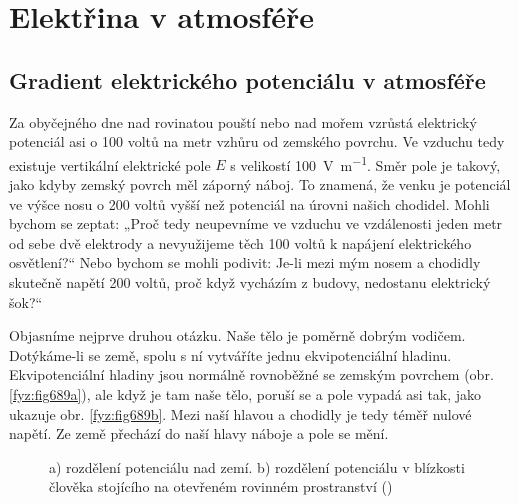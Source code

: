 \setchaptertoc
\chapter{Elektřina v atmosféře}\label{fyz:IIchapIX}  
  \section{Gradient elektrického potenciálu v atmosféře}\label{fyz:IIchapIXsecI}  
    Za obyčejného dne nad rovinatou pouští nebo nad mořem vzrůstá elektrický potenciál asi o
    \num{100} voltů na metr vzhůru od zemského povrchu. Ve vzduchu tedy existuje vertikální
    elektrické pole \(E\) s velikostí \SI{100}{\V\per\m}. Směr pole je takový, jako kdyby zemský
    povrch měl záporný náboj. To znamená, že venku je potenciál ve výšce nosu o \num{200} voltů
    vyšší než potenciál na úrovni našich chodidel. Mohli bychom se zeptat: „Proč tedy neupevníme ve
    vzduchu ve vzdálenosti jeden metr od sebe dvě elektrody a nevyužijeme těch \num{100} voltů k
    napájení elektrického osvětlení?“ Nebo bychom se mohli podivit: Je-li mezi mým nosem a chodidly
    skutečně napětí 200 voltů, proč když vycházím z budovy, nedostanu elektrický šok?“

    Objasníme nejprve druhou otázku. Naše tělo je poměrně dobrým vodičem. Dotýkáme-li se země, spolu
    s ní vytváříte jednu ekvipotenciální hladinu. Ekvipotenciální hladiny jsou normálně rovnoběžné
    se zemským povrchem (obr. \ref{fyz:fig689a}), ale když je tam naše tělo, poruší se a pole vypadá
    asi tak, jako ukazuje obr. \ref{fyz:fig689b}. Mezi naší hlavou a chodidly je tedy téměř nulové
    napětí. Ze země přechází do naší hlavy náboje a pole se mění.

    \begin{figure}[ht!]
      \centering
                     \newline
      \caption{a) rozdělení potenciálu nad zemí. b) rozdělení potenciálu v blízkosti člověka 
               stojícího na otevřeném rovinném prostranství (\cite[s.~748]{Feynman02})}
      \label{fyz:fig689}
    \end{figure}

